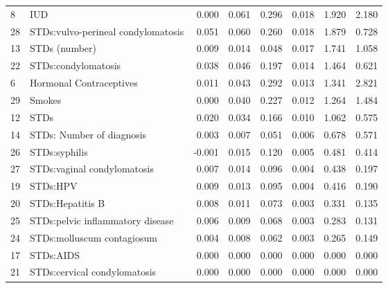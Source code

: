 \documentclass{article}
\begin{document}
\begin{tabular}{llrrrrrr}
8  &                                 IUD &  0.000 &     0.061 &     0.296 &          0.018 &   1.920 &   2.180 \\
28 &  STDs:vulvo-perineal condylomatosis &  0.051 &     0.060 &     0.260 &          0.018 &   1.879 &   0.728 \\
13 &                       STDs (number) &  0.009 &     0.014 &     0.048 &          0.017 &   1.741 &   1.058 \\
22 &                 STDs:condylomatosis &  0.038 &     0.046 &     0.197 &          0.014 &   1.464 &   0.621 \\
6  &             Hormonal Contraceptives &  0.011 &     0.043 &     0.292 &          0.013 &   1.341 &   2.821 \\
29 &                              Smokes &  0.000 &     0.040 &     0.227 &          0.012 &   1.264 &   1.484 \\
12 &                                STDs &  0.020 &     0.034 &     0.166 &          0.010 &   1.062 &   0.575 \\
14 &           STDs: Number of diagnosis &  0.003 &     0.007 &     0.051 &          0.006 &   0.678 &   0.571 \\
26 &                       STDs:syphilis & -0.001 &     0.015 &     0.120 &          0.005 &   0.481 &   0.414 \\
27 &         STDs:vaginal condylomatosis &  0.007 &     0.014 &     0.096 &          0.004 &   0.438 &   0.197 \\
19 &                            STDs:HPV &  0.009 &     0.013 &     0.095 &          0.004 &   0.416 &   0.190 \\
20 &                    STDs:Hepatitis B &  0.008 &     0.011 &     0.073 &          0.003 &   0.331 &   0.135 \\
25 &    STDs:pelvic inflammatory disease &  0.006 &     0.009 &     0.068 &          0.003 &   0.283 &   0.131 \\
24 &          STDs:molluscum contagiosum &  0.004 &     0.008 &     0.062 &          0.003 &   0.265 &   0.149 \\
17 &                           STDs:AIDS &  0.000 &     0.000 &     0.000 &          0.000 &   0.000 &   0.000 \\
21 &        STDs:cervical condylomatosis &  0.000 &     0.000 &     0.000 &          0.000 &   0.000 &   0.000 \\
\bottomrule
\end{tabular}
\end{document}
